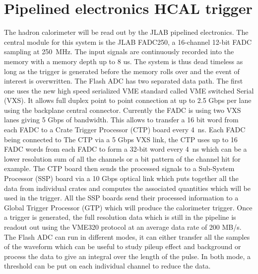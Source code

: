 \documentclass{article}
\begin{document}
\section{Pipelined electronics HCAL trigger}
\label{sec:hcal-vxs}
The hadron calorimeter will be read out by the JLAB pipelined electronics.
The central module for this system is the JLAB FADC250, a 16-channel 12-bit FADC sampling at 250~MHz. The input signals are continuously recorded into the memory with a memory depth up to 8 us. The system is thus dead timeless as long as the trigger is generated before the memory rolls over and the event of interest is overwritten.
The Flash ADC has two separated data path.
The first one uses the new high speed serialized VME standard called VME switched Serial (VXS).
It allows full duplex point to point connection at up to 2.5 Gbps per lane using the backplane central connector.
Currently the FADC is using two VXS lanes giving 5 Gbps of bandwidth.
This allows to transfer a 16 bit word from each FADC to a Crate Trigger Processor (CTP) board every 4~ns.
Each FADC being connected to The CTP via a 5 Gbps VXS link, the CTP uses up to 16 FADC words from each FADC to form a 32-bit word every 4~ns which can be a lower resolution sum of all the channels or a bit pattern of the channel hit for example.
The CTP board then sends the processed signals to a Sub-System Processor (SSP) board via a 10 Gbps optical link which puts together all the data from individual crates and computes the associated quantities which will be used in the trigger.
All the SSP boards send their processed information to a Global Trigger Processor (GTP) which will produce the calorimeter trigger.
Once a trigger is generated, the full resolution data which is still in the pipeline is readout out using the VME320 protocol at an average data rate of 200 MB/s.
The Flash ADC can run in different modes, it can either transfer all the samples of the waveform which can be useful to study pileup effect and background or process the data to give an integral over the length of the pulse. In both mode, a threshold can be put on each individual channel to reduce the data.
\end{document}
